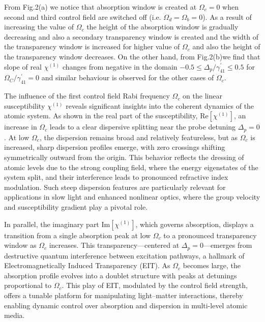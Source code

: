 \documentclass[a4paper,12pt]{article}
\begin{document}
From Fig.2(a) we notice that absorption window is created at $\Omega_{c}=0$ when second and third control field are switched off (i.e. $\Omega_{d}=\Omega_{b}=0$). As a result of increasing the value of $\Omega_{c}$ the height of the absorption window is gradually decreasing and also a secondary transparency window is created and the width of the transparency window is increased for higher value of $\Omega_{c}$ and also the height of the transparency window decreases. On the other hand, from Fig.2(b)we find that slope of real $\chi^{(1)}$ changes from negative in the domain $-0.5 \leq \Delta_{p}/\gamma^{\prime}_{41} \leq 0.5$ for $\Omega_{C}/\gamma^{\prime}_{41}=0$ and similar behaviour is observed for the other cases of $\Omega_{c}$.

The influence of the first control field Rabi frequency $\Omega_c$ on the linear susceptibility $\chi^{(1)}$ reveals significant insights into the coherent dynamics of the atomic system. As shown in the real part of the susceptibility, $\mathrm{Re}[\chi^{(1)}]$, an increase in $\Omega_c$ leads to a clear dispersive splitting near the probe detuning $\Delta_p = 0$. At low $\Omega_c$, the dispersion remains broad and relatively featureless, but as $\Omega_c$ is increased, sharp dispersion profiles emerge, with zero crossings shifting symmetrically outward from the origin. This behavior reflects the dressing of atomic levels due to the strong coupling field, where the energy eigenstates of the system split, and their interference leads to pronounced refractive index modulation. Such steep dispersion features are particularly relevant for applications in slow light and enhanced nonlinear optics, where the group velocity and susceptibility gradient play a pivotal role.

In parallel, the imaginary part $\mathrm{Im}[\chi^{(1)}]$, which governs absorption, displays a transition from a single absorption peak at low $\Omega_c$ to a pronounced transparency window as $\Omega_c$ increases. This transparency---centered at $\Delta_p = 0$---emerges from destructive quantum interference between excitation pathways, a hallmark of Electromagnetically Induced Transparency (EIT). As $\Omega_c$ becomes large, the absorption profile evolves into a doublet structure with peaks at detunings proportional to $\Omega_c$. This play of EIT, modulated by the control field strength, offers a tunable platform for manipulating light--matter interactions, thereby enabling dynamic control over absorption and dispersion in multi-level atomic media.
\end{document}
